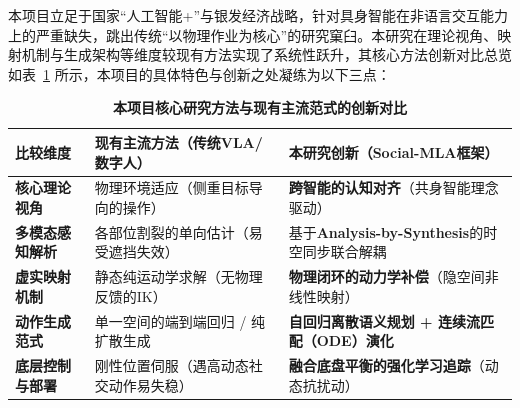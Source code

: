 

本项目立足于国家“人工智能+”与银发经济战略，针对具身智能在非语言交互能力上的严重缺失，跳出传统“以物理作业为核心”的研究窠臼。本研究在理论视角、映射机制与生成架构等维度较现有方法实现了系统性跃升，其核心方法创新对比总览如表~\ref{tab:method_innovation} 所示，本项目的具体特色与创新之处凝练为以下三点：

\begin{table}[htbp]
  \centering
  \fontsize{11}{14}\selectfont %
  \caption{\textbf{本项目核心研究方法与现有主流范式的创新对比}}
  \label{tab:method_innovation}
  \begin{tabular}{p{} p{} p{}}
  \toprule
  \textbf{比较维度} & \textbf{现有主流方法（传统VLA/数字人）} & \textbf{本研究创新（Social-MLA框架）} \\
  \midrule
  \textbf{核心理论视角} & 物理环境适应（侧重目标导向的操作） & \textbf{跨智能的认知对齐}（共身智能理念驱动） \\
  \textbf{多模态感知解析} & 各部位割裂的单向估计（易受遮挡失效） & 基于\textbf{Analysis-by-Synthesis}的时空同步联合解耦 \\
  \textbf{虚实映射机制} & 静态纯运动学求解（无物理反馈的IK） & \textbf{物理闭环的动力学补偿}（隐空间非线性映射） \\
  \textbf{动作生成范式} & 单一空间的端到端回归 / 纯扩散生成 & \textbf{自回归离散语义规划 + 连续流匹配（ODE）演化} \\
  \textbf{底层控制与部署} & 刚性位置伺服（遇高动态社交动作易失稳） & \textbf{融合底盘平衡的强化学习追踪}（动态抗扰动） \\
  \bottomrule
  \end{tabular}
\end{table}


